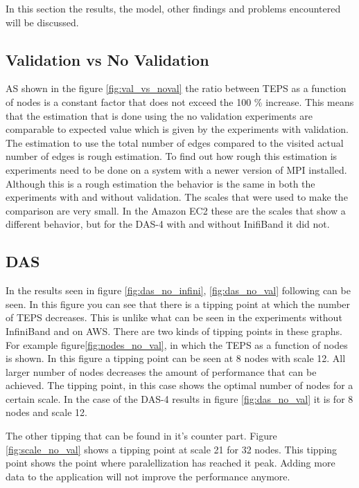 In this section the results, the model, other findings and problems encountered will be discussed.

\subsection{Validation vs No Validation}
AS shown in the figure \ref{fig:val_vs_noval} the ratio between TEPS as a function of nodes is a constant factor that does not exceed the 100 \% increase. This means that the estimation that is done using the no validation experiments are comparable to expected value which is given by the experiments with validation. The estimation to use the total number of edges compared to the visited actual number of edges is rough estimation. To find out how rough this estimation is experiments need to be done on a system with a newer version of MPI installed. Although this is a rough estimation the behavior is the same in both the experiments with and without validation.
The scales that were used to make the comparison are very small. In the Amazon EC2 these are the scales that show a different behavior, but for the DAS-4 with and without InifiBand it did not. 

\subsection{DAS}
In the results seen in figure \ref{fig:das_no_infini}, \ref{fig:das_no_val} following can be seen. In this figure you can see that there is a tipping point at which the number of TEPS decreases. This is unlike what can be seen in the experiments without InfiniBand and on AWS. There are two kinds of tipping points in these graphs. For example figure\ref{fig:nodes_no_val}, in which the TEPS as a function of nodes is shown. In this figure a tipping point can be seen at 8 nodes with scale 12. All larger number of nodes decreases the amount of performance that can be achieved. The tipping point, in this case shows the optimal number of nodes for a certain scale. In the case of the DAS-4 results in figure \ref{fig:das_no_val} it is for 8 nodes and scale 12.

The other tipping that can be found in it's counter part. Figure \ref{fig:scale_no_val} shows a tipping point at scale 21 for 32 nodes. This tipping point shows the point where paralellization has reached it peak. Adding more data to the application will not improve the performance anymore. 

